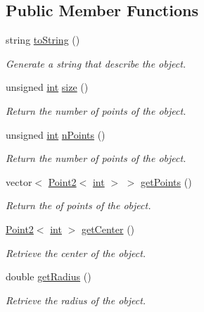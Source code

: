 \subsection*{Public Member Functions}
\begin{DoxyCompactItemize}
\item 
string \mbox{\hyperlink{class_object_acf6d17366700fe12cafd6269561fad69}{to\+String}} ()
\begin{DoxyCompactList}\small\item\em Generate a string that describe the object. \end{DoxyCompactList}\item 
unsigned \mbox{\hyperlink{draw_8hh_aa620a13339ac3a1177c86edc549fda9b}{int}} \mbox{\hyperlink{class_object_a429286aef9c0c1f83e5ff668b6b75e6a}{size}} ()
\begin{DoxyCompactList}\small\item\em Return the number of points of the object. \end{DoxyCompactList}\item 
unsigned \mbox{\hyperlink{draw_8hh_aa620a13339ac3a1177c86edc549fda9b}{int}} \mbox{\hyperlink{class_object_a27b5515d2b0b695a0a402d8bbda3a4fa}{n\+Points}} ()
\begin{DoxyCompactList}\small\item\em Return the number of points of the object. \end{DoxyCompactList}\item 
vector$<$ \mbox{\hyperlink{class_point2}{Point2}}$<$ \mbox{\hyperlink{draw_8hh_aa620a13339ac3a1177c86edc549fda9b}{int}} $>$ $>$ \mbox{\hyperlink{class_object_a21f5814fc1e2b6765bdefca5091f2e26}{get\+Points}} ()
\begin{DoxyCompactList}\small\item\em Return the of points of the object. \end{DoxyCompactList}\item 
\mbox{\hyperlink{class_point2}{Point2}}$<$ \mbox{\hyperlink{draw_8hh_aa620a13339ac3a1177c86edc549fda9b}{int}} $>$ \mbox{\hyperlink{class_object_aa624c3f9e2958743a0ae7efc78f5d586}{get\+Center}} ()
\begin{DoxyCompactList}\small\item\em Retrieve the center of the object. \end{DoxyCompactList}\item 
double \mbox{\hyperlink{class_object_ac7932a458c6259d0b61bc294b3c5369c}{get\+Radius}} ()
\begin{DoxyCompactList}\small\item\em Retrieve the radius of the object. \end{DoxyCompactList}\item 

\end{DoxyCompactItemize}
